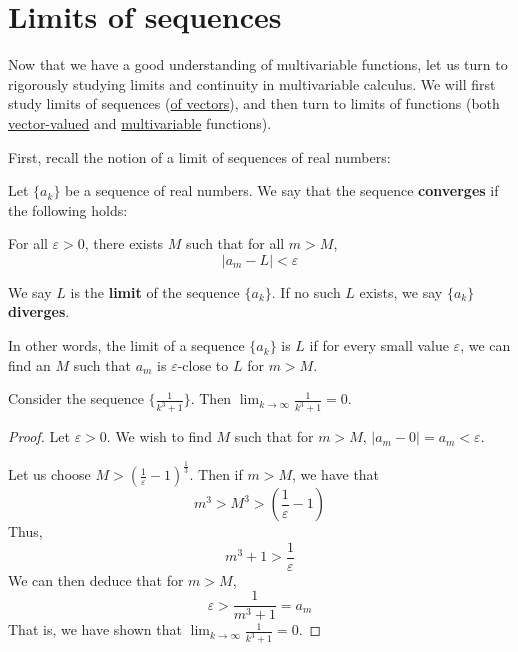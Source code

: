 \section{Limits of sequences}\label{sec:limits}

Now that we have a good understanding of multivariable functions, let us turn to rigorously studying limits and continuity in multivariable calculus.  We will first study limits of sequences (\hyperref[limseq]{of vectors}), and then turn to limits of functions (both \hyperref[limvectorval]{vector-valued} and \hyperref[limmulti]{multivariable} functions).

First, recall the notion of a limit of sequences of real numbers:

\begin{definition}
Let $\{a_k\}$ be a sequence of real numbers.  We say that the sequence \textbf{converges} if the following holds:

For all $\varepsilon>0$, there exists $M$ such that for all $m > M$, $$|a_m - L | < \varepsilon$$
    
We say $L$ is the \textbf{limit} of the sequence $\{a_k\}$.  If no such $L$ exists, we say $\{a_k\}$ \textbf{diverges}.
\end{definition}

In other words, the limit of a sequence $\{a_k\}$ is $L$ if for every small value $\varepsilon$, we can find an $M$ such that $a_m$ is $\varepsilon$-close to $L$ for $m > M$.



\begin{example}
Consider the sequence $\{\frac{1}{k^3 + 1}\}$.  Then $\lim_{k \to \infty} \frac{1}{k^3 + 1} = 0$.

\begin{proof}
Let $\varepsilon > 0$.  We wish to find $M$ such that for $m > M$, $|a_m - 0|  = a_m < \varepsilon$.

Let us choose $M > (\frac{1}{\varepsilon}-1)^{\frac{1}{3}}$.  Then if $m > M$, we have that $$m^3 > M^3 >  (\frac{1}{\varepsilon}-1)$$
Thus, $$m^3 +1  > \frac{1}{\varepsilon}$$
We can then deduce that for $m > M$,  $$\varepsilon > \frac{1}{m^3 +1} =a_m$$
That is, we have shown that $\lim_{k \to \infty} \frac{1}{k^3 + 1} = 0$.


\end{proof}

\end{example}





